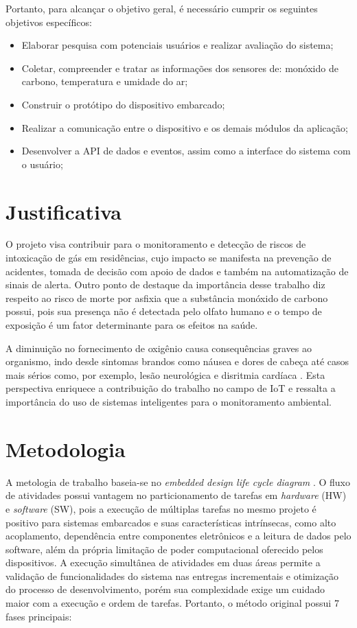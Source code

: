 Portanto, para alcançar o objetivo geral, é necessário cumprir os seguintes objetivos específicos:
\begin{itemize}
    \item Elaborar pesquisa com potenciais usuários e realizar avaliação do sistema;
    \item Coletar, compreender e tratar as informações dos sensores de: monóxido de carbono, temperatura e umidade do ar;
    \item Construir o protótipo do dispositivo embarcado;
    \item Realizar a comunicação entre o dispositivo e os demais módulos da aplicação;
    \item Desenvolver a API de dados e eventos, assim como a interface do sistema com o usuário;
\end{itemize}

\section{Justificativa}

O projeto visa contribuir para o monitoramento e detecção de riscos de intoxicação de gás em residências, cujo 
impacto se manifesta na prevenção de acidentes, tomada de decisão com apoio de dados e também na automatização 
de sinais de alerta. Outro ponto de destaque da importância desse trabalho diz respeito ao risco de morte por asfixia 
que a substância monóxido de carbono possui, pois sua presença não é detectada pelo olfato humano e o tempo de exposição é um 
fator determinante para os efeitos na saúde. 

A diminuição no fornecimento de oxigênio causa consequências graves ao organismo, indo desde sintomas brandos como náusea e dores de 
cabeça até casos mais sérios como, por exemplo, lesão neurológica e disritmia cardíaca \cite{carbon-monoxide-poisoning-varon}. Esta perspectiva enriquece a 
contribuição do trabalho no campo de IoT e ressalta a importância do uso de sistemas inteligentes para o monitoramento ambiental.  

\section{Metodologia}

A metologia de trabalho baseia-se no \textit{embedded design life cycle diagram} \cite{system-design-IOT}. O fluxo de atividades possui vantagem no 
particionamento de tarefas em \textit{hardware} (HW) e \textit{software} (SW), pois 
a execução de  múltiplas tarefas no mesmo projeto é positivo para sistemas embarcados e 
suas características intrínsecas, como alto acoplamento, dependência entre componentes eletrônicos e a leitura de dados pelo software, além da própria limitação de 
poder computacional oferecido pelos dispositivos. A execução simultânea de atividades em 
duas áreas permite a validação de funcionalidades do sistema nas entregas incrementais e otimização do 
processo de desenvolvimento, porém sua complexidade exige um cuidado maior com a execução e ordem de tarefas. Portanto, o método original possui 7 fases principais:  

